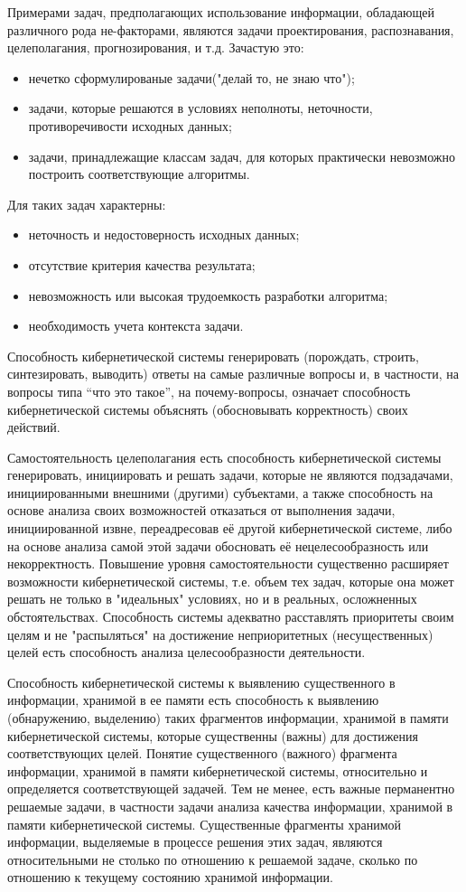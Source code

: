 Примерами задач, предполагающих использование информации, обладающей различного рода не-факторами, являются задачи проектирования, распознавания, целеполагания, прогнозирования, и т.д. Зачастую это:
\begin{itemize}
    \item{нечетко сформулированые задачи("делай то, не знаю что");}
    \item{задачи, которые решаются в условиях неполноты, неточности, противоречивости исходных данных;}
    \item{задачи, принадлежащие классам задач, для которых практически невозможно построить соответствующие алгоритмы.}
\end{itemize}
Для таких задач характерны:
\begin{itemize}
    \item{неточность и недостоверность исходных данных;}
    \item{отсутствие критерия качества результата;}
    \item{невозможность или высокая трудоемкость разработки алгоритма;}
    \item{необходимость учета контекста задачи.}
\end{itemize}

Способность кибернетической системы генерировать (порождать, строить, синтезировать, выводить) ответы на самые различные вопросы и, в частности, на вопросы типа “что это такое”{}, на почему-вопросы, означает способность кибернетической системы объяснять (обосновывать корректность) своих действий.

Самостоятельность целеполагания есть способность кибернетической системы генерировать, инициировать и решать задачи, которые не являются подзадачами, инициированными внешними (другими) субъектами, а также способность на основе анализа своих возможностей отказаться от выполнения задачи, инициированной извне, переадресовав её другой кибернетической системе, либо на основе анализа самой этой задачи обосновать её нецелесообразность или некорректность. 
Повышение уровня самостоятельности существенно расширяет возможности кибернетической системы, т.е. объем тех задач, которые она может решать не только в "идеальных"{} условиях, но и в реальных, осложненных обстоятельствах.
Способность системы адекватно расставлять приоритеты своим целям и не "распыляться"{} на достижение неприоритетных (несущественных) целей есть способность анализа целесообразности деятельности.

Способность кибернетической системы к выявлению существенного в информации, хранимой в ее памяти есть способность к выявлению (обнаружению, выделению) таких фрагментов информации, хранимой в памяти кибернетической системы, которые существенны (важны) для достижения соответствующих целей.
Понятие существенного (важного) фрагмента информации, хранимой в памяти кибернетической системы, относительно и определяется соответствующей задачей.
Тем не менее, есть важные перманентно решаемые задачи, в частности задачи анализа качества информации, хранимой в памяти кибернетической системы.
Существенные фрагменты хранимой информации, выделяемые в процессе решения этих задач, являются относительными не столько по отношению к решаемой задаче, сколько по отношению к текущему состоянию хранимой информации.

